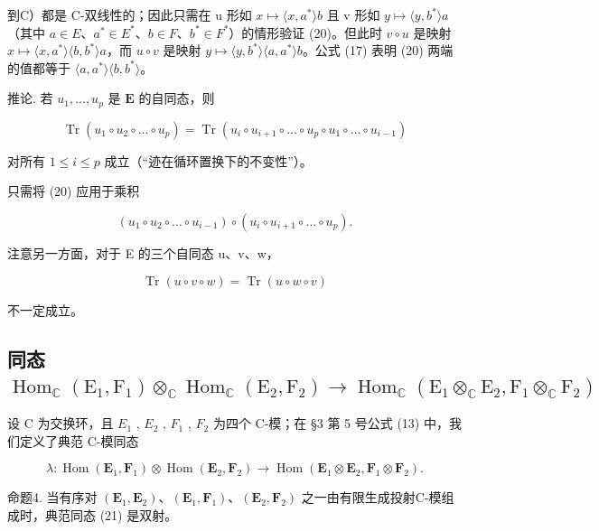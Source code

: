 到C）都是 C-双线性的；因此只需在 u 形如 \(x \mapsto \langle x, a^{*} \rangle b\) 且 v 形如 \(y \mapsto \langle y, b^{*} \rangle a\)（其中 \(a \in E\)、\(a^{*} \in E^{*}\)、\(b \in F\)、\(b^{*} \in F^{*}\)）的情形验证 (20)。但此时 \(v \circ u\) 是映射 \(x \mapsto \langle x, a^{*} \rangle \langle b, b^{*} \rangle a\)，而 \(u \circ v\) 是映射 \(y \mapsto \langle y, b^{*} \rangle \langle a, a^{*} \rangle b\)。公式 (17) 表明 (20) 两端的值都等于 \(\langle a, a^{*} \rangle \langle b, b^{*} \rangle\)。

推论. 若 \(u_1, \ldots, u_p\) 是 \(\mathbf{E}\) 的自同态，则

\[
\operatorname{Tr} \left(u _ {1} \circ u _ {2} \circ \dots \circ u _ {p}\right) = \operatorname{Tr} \left(u _ {i} \circ u _ {i + 1} \circ \dots \circ u _ {p} \circ u _ {1} \circ \dots \circ u _ {i - 1}\right)
\]

对所有 \(1 \leqslant i \leqslant p\) 成立（“迹在循环置换下的不变性”）。

只需将 (20) 应用于乘积

\[
\left(u _ {1} \circ u _ {2} \circ \dots \circ u _ {i - 1}\right) \circ \left(u _ {i} \circ u _ {i + 1} \circ \dots \circ u _ {p}\right).
\]

注意另一方面，对于 E 的三个自同态 u、v、w，

\[
\operatorname{Tr} (u \circ v \circ w) = \operatorname{Tr} (u \circ w \circ v)
\]

不一定成立。

\subsection{\texorpdfstring{同态 \(\operatorname{Hom}_{\mathbb{C}}(\mathrm{E}_1, \mathrm{F}_1) \otimes_{\mathbb{C}} \operatorname{Hom}_{\mathbb{C}}(\mathrm{E}_2, \mathrm{F}_2) \to \operatorname{Hom}_{\mathbb{C}}(\mathrm{E}_1 \otimes_{\mathbb{C}} \mathrm{E}_2, \mathrm{F}_1 \otimes_{\mathbb{C}} \mathrm{F}_2)\)}{从 E1,F1 上的 Hom 与 E2,F2 上的 Hom 的 C 上张量积到相应张量积上的 Hom 的同态}}

设 C 为交换环，且 \(E_{1}\) , \(E_{2}\) , \(F_{1}\) , \(F_{2}\) 为四个 C-模；在 §3 第 5 号公式 (13) 中，我们定义了典范 C-模同态

\[
\lambda : \operatorname{Hom} (\mathbf {E} _ {1}, \mathbf {F} _ {1}) \otimes \operatorname{Hom} (\mathbf {E} _ {2}, \mathbf {F} _ {2}) \to \operatorname{Hom} (\mathbf {E} _ {1} \otimes \mathbf {E} _ {2}, \mathbf {F} _ {1} \otimes \mathbf {F} _ {2}). \tag {21}
\]

命题4. 当有序对 \((\mathbf{E}_1, \mathbf{E}_2)\)、\((\mathbf{E}_1, \mathbf{F}_1)\)、\((\mathbf{E}_2, \mathbf{F}_2)\) 之一由有限生成投射C-模组成时，典范同态 (21) 是双射。

